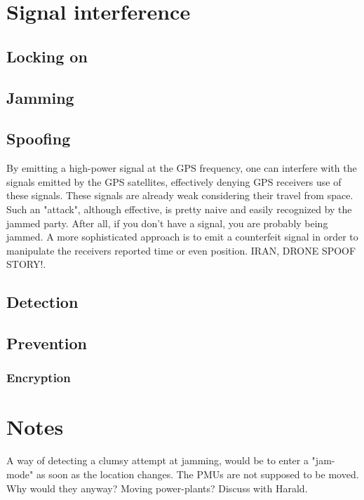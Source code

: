 \documentclass[12pt,english,a4paper]{article}
\begin{document}
\section{Signal interference}
\subsection{Locking on}
\subsection{Jamming}
\subsection{Spoofing}

By emitting a high-power signal at the GPS frequency, one can interfere with the signals emitted by the GPS satellites, effectively denying GPS receivers use of these signals. These signals are already weak considering their travel from space. Such an "attack", although effective, is pretty naive and easily recognized by the jammed party. After all, if you don't have a signal, you are probably being jammed. A more sophisticated approach is to emit a counterfeit signal in order to manipulate the receivers reported time or even position. IRAN, DRONE SPOOF STORY!. 

\subsection{Detection}
\subsection{Prevention}
\subsubsection{Encryption}

\section{Notes}
A way of detecting a clumsy attempt at jamming, would be to enter a "jam-mode" as soon as the location changes. The PMUs are not supposed to be moved. Why would they anyway? Moving power-plants? Discuss with Harald.

\newpage
\printbibliography[title={Complete Bibliography},heading=bibintoc]
\end{document}
